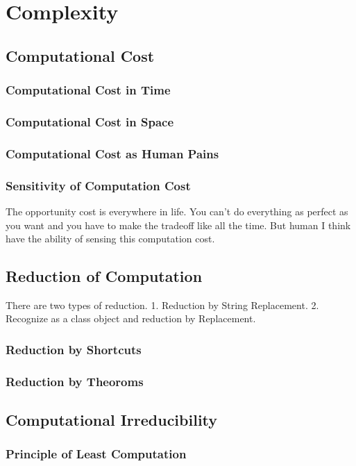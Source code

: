 \chapter{Complexity}

\section{Computational Cost}
\subsection{Computational Cost in Time}
\subsection{Computational Cost in Space}
\subsection{Computational Cost as Human Pains}
\subsection{Sensitivity of Computation Cost}

The opportunity cost is everywhere in life. You can't do everything as perfect as you want and you have to make the tradeoff like all the time. But human I think have the ability of sensing this computation cost.

\section{Reduction of Computation}
There are two types of reduction.
1. Reduction by String Replacement.
2. Recognize as a class object and reduction by Replacement.
\subsection{Reduction by Shortcuts}
\subsection{Reduction by Theoroms}

\section{Computational Irreducibility}
\subsection{Principle of Least Computation}
